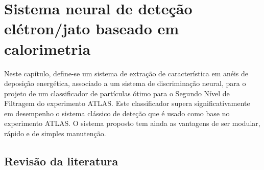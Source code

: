 \typeout{ ====================================================================}
\typeout{ ====================================================================}

\chapter{Sistema neural de deteção elétron/jato baseado em calorimetria}
\label{chap:neural}

Neste capítulo, define-se um sistema de extração de característica em anéis de
deposição energética, associado a um sistema de discriminação neural, para o
projeto de um classificador de partículas ótimo para o Segundo Nível de
Filtragem do experimento ATLAS. Este classificador supera significativamente
em desempenho o sistema clássico de deteção que é usado como base no
experimento ATLAS. O sistema proposto tem ainda as vantagens de ser modular,
rápido e de simples manutenção.

\section{Revisão da literatura}
\label{sec:review}




